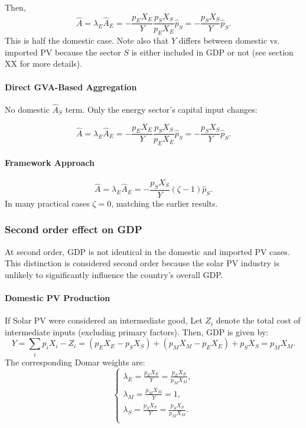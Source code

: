 \documentclass[11pt]{article}
\begin{document}
Then,
\[
\hat{A}=\lambda_E\hat{A}_E=-\frac{p_EX_E}{Y}\frac{p_SX_S}{p_EX_E}\hat{p}_S=-\frac{p_SX_S}{Y}\hat{p}_S.
\]
This is half the domestic case. Note also that $Y$ differs between domestic vs. imported PV because the sector $S$ is either included in GDP or not (see section XX for more details).

\paragraph{Direct GVA-Based Aggregation}
No domestic $\hat{A}_S$ term. Only the energy sector's capital input changes:

\begin{equation}
    \hat{A} = \lambda_E\hat{A}_E=-\frac{p_EX_E}{Y}\frac{p_SX_S}{p_EX_E}\hat{p}_S=-\frac{p_SX_S}{Y} \hat{p}_{S}.
\end{equation}

\paragraph{Framework Approach}
\begin{equation*}
    \hat{A}=\lambda_E\hat{A}_E=-\frac{p_SX_S}{Y}(\zeta-1)\hat{p}_S.
\end{equation*}
In many practical cases $\zeta=0$, matching the earlier results.

\subsubsection{Second order effect on GDP}

At second order, GDP is not identical in the domestic and imported PV cases. This distinction is considered second order because the solar PV industry is unlikely to significantly influence the country's overall GDP.

\paragraph{Domestic PV Production}  

If Solar PV were considered an intermediate good,
Let $Z_i$ denote the total cost of intermediate inputs (excluding primary factors). Then, GDP is given by:
\begin{equation}
     Y = \sum_i p_i X_i - Z_i = (p_E X_E - p_S X_S) + (p_M X_M - p_E X_E) + p_S X_S = p_M X_M.
\end{equation}
The corresponding Domar weights are:
\begin{equation}
    \begin{cases}
        \lambda_E = \frac{p_E X_E}{Y} = \frac{p_E X_E}{p_M X_M},\\
        \lambda_M = \frac{p_M X_M}{Y} = 1,\\
        \lambda_S = \frac{p_S X_S}{Y} = \frac{p_S X_S}{p_M X_M}.\\
    \end{cases}
\end{equation}
\end{document}
